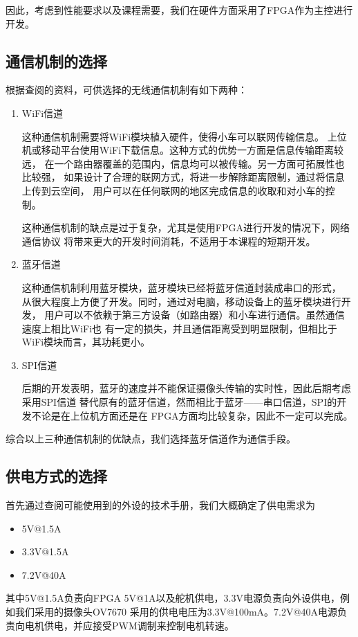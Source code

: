 \documentclass[a4paper]{paper}
\begin{document}
因此，考虑到性能要求以及课程需要，我们在硬件方面采用了FPGA作为主控进行开发。
\subsection{通信机制的选择}
根据查阅的资料，可供选择的无线通信机制有如下两种：

\begin{enumerate}
    \item WiFi信道

    这种通信机制需要将WiFi模块植入硬件，使得小车可以联网传输信息。
    上位机或移动平台使用WiFi下载信息。这种方式的优势一方面是信息传输距离较远，
    在一个路由器覆盖的范围内，信息均可以被传输。另一方面可拓展性也比较强，
    如果设计了合理的联网方式，将进一步解除距离限制，通过将信息上传到云空间，
    用户可以在任何联网的地区完成信息的收取和对小车的控制。

    这种通信机制的缺点是过于复杂，尤其是使用FPGA进行开发的情况下，网络通信协议
    将带来更大的开发时间消耗，不适用于本课程的短期开发。

    \item 蓝牙信道

    这种通信机制利用蓝牙模块，蓝牙模块已经将蓝牙信道封装成串口的形式，
    从很大程度上方便了开发。同时，通过对电脑，移动设备上的蓝牙模块进行开发，
    用户可以不依赖于第三方设备（如路由器）和小车进行通信。虽然通信速度上相比WiFi也
    有一定的损失，并且通信距离受到明显限制，但相比于WiFi模块而言，其功耗更小。

    \item SPI信道

    后期的开发表明，蓝牙的速度并不能保证摄像头传输的实时性，因此后期考虑采用SPI信道
    替代原有的蓝牙信道，然而相比于蓝牙——串口信道，SPI的开发不论是在上位机方面还是在
    FPGA方面均比较复杂，因此不一定可以完成。

\end{enumerate}
综合以上三种通信机制的优缺点，我们选择蓝牙信道作为通信手段。
\subsection{供电方式的选择}
首先通过查阅可能使用到的外设的技术手册，我们大概确定了供电需求为
\begin{itemize}
    \item 5V@1.5A
    \item 3.3V@1.5A
    \item 7.2V@40A
\end{itemize}
其中5V@1.5A负责向FPGA 5V@1A以及舵机供电，3.3V电源负责向外设供电，例如我们采用的摄像头OV7670
采用的供电电压为3.3V@100mA。7.2V@40A电源负责向电机供电，并应接受PWM调制来控制电机转速。
\end{document}
